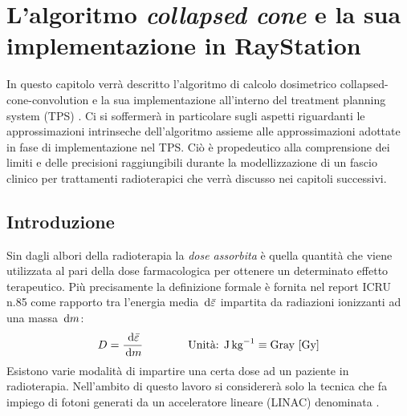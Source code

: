\chapter{L'algoritmo \emph{collapsed cone} e la sua implementazione in RayStation}
\setcounter{minitocdepth}{1}
\minitoc
\setcounter{minitocdepth}{2}
\textsf{In questo capitolo verrà descritto l'algoritmo di calcolo dosimetrico collapsed-cone-convolution e la sua implementazione all'interno del treatment planning system (TPS) \RS. Ci si soffermerà in particolare sugli aspetti riguardanti le approssimazioni intrinseche dell'algoritmo assieme alle approssimazioni adottate in fase di implementazione nel TPS. Ciò è propedeutico alla comprensione dei limiti e delle precisioni raggiungibili durante la modellizzazione di un fascio clinico per trattamenti radioterapici che verrà discusso nei capitoli successivi.}

\section{Introduzione}
Sin dagli albori della radioterapia la \textit{dose assorbita} è quella quantità che viene utilizzata al pari della dose farmacologica per ottenere un determinato effetto terapeutico. Più precisamente la definizione formale è fornita nel report ICRU n.85 \cite{ICRU85} come rapporto tra l'energia media $\,\text{d} \bar{\varepsilon}$ impartita da radiazioni ionizzanti ad una massa $\,\text{d} m$:
\begin{equation}
D = \frac{\,\text{d} \bar{\varepsilon}}{\,\text{d} m} \qquad\qquad \text{Unità: J\,kg}^{-1} \equiv \text{Gray [Gy]}
\end{equation} 
Esistono varie modalità di impartire una certa dose ad un paziente in radioterapia. Nell'ambito di questo lavoro si considererà solo la tecnica che fa impiego di fotoni generati da un acceleratore lineare (LINAC) denominata .


